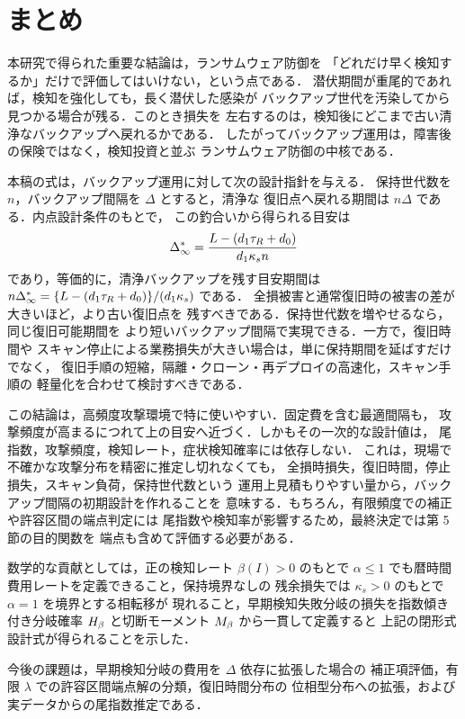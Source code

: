 \section{まとめ}

本研究で得られた重要な結論は，ランサムウェア防御を
「どれだけ早く検知するか」だけで評価してはいけない，という点である．
潜伏期間が重尾的であれば，検知を強化しても，長く潜伏した感染が
バックアップ世代を汚染してから見つかる場合が残る．このとき損失を
左右するのは，検知後にどこまで古い清浄なバックアップへ戻れるかである．
したがってバックアップ運用は，障害後の保険ではなく，検知投資と並ぶ
ランサムウェア防御の中核である．

本稿の式は，バックアップ運用に対して次の設計指針を与える．
保持世代数を $n$，バックアップ間隔を $\Delta$ とすると，清浄な
復旧点へ戻れる期間は $n\Delta$ である．内点設計条件のもとで，
この釣合いから得られる目安は
\[
  \Delta_\infty^\ast=\frac{L-(d_1\tau_R+d_0)}{d_1\kappa_s n}
\]
であり，等価的に，清浄バックアップを残す目安期間は
$n\Delta_\infty^\ast=\{L-(d_1\tau_R+d_0)\}/(d_1\kappa_s)$ である．
全損被害と通常復旧時の被害の差が大きいほど，より古い復旧点を
残すべきである．保持世代数を増やせるなら，同じ復旧可能期間を
より短いバックアップ間隔で実現できる．一方で，復旧時間や
スキャン停止による業務損失が大きい場合は，単に保持期間を延ばすだけでなく，
復旧手順の短縮，隔離・クローン・再デプロイの高速化，スキャン手順の
軽量化を合わせて検討すべきである．

この結論は，高頻度攻撃環境で特に使いやすい．固定費を含む最適間隔も，
攻撃頻度が高まるにつれて上の目安へ近づく．しかもその一次的な設計値は，
尾指数，攻撃頻度，検知レート，症状検知確率には依存しない．
これは，現場で不確かな攻撃分布を精密に推定し切れなくても，
全損時損失，復旧時間，停止損失，スキャン負荷，保持世代数という
運用上見積もりやすい量から，バックアップ間隔の初期設計を作れることを
意味する．もちろん，有限頻度での補正や許容区間の端点判定には
尾指数や検知率が影響するため，最終決定では第 5 節の目的関数を
端点も含めて評価する必要がある．

数学的な貢献としては，正の検知レート $\beta(I)>0$ のもとで
$\alpha\le1$ でも暦時間費用レートを定義できること，保持境界なしの
残余損失では $\kappa_s>0$ のもとで $\alpha=1$ を境界とする相転移が
現れること，早期検知失敗分岐の損失を指数傾き付き分岐確率
$H_\beta$ と切断モーメント $M_\beta$ から一貫して定義すると
上記の閉形式設計式が得られることを示した．

今後の課題は，早期検知分岐の費用を $\Delta$ 依存に拡張した場合の
補正項評価，有限 $\lambda$ での許容区間端点解の分類，復旧時間分布の
位相型分布への拡張，および実データからの尾指数推定である．
